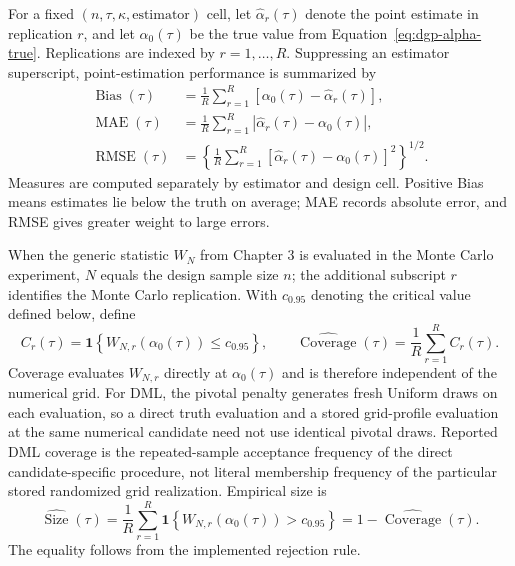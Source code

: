 For a fixed $(n,\tau,\kappa,\text{estimator})$ cell, let $\widehat{\alpha}_r(\tau)$ denote the point estimate in replication $r$, and let $\alpha_0(\tau)$ be the true value from Equation~\eqref{eq:dgp-alpha-true}. Replications are indexed by $r=1,\ldots,R$. Suppressing an estimator superscript, point-estimation performance is summarized by
\begin{equation}
  \begin{aligned}
    \operatorname{Bias}(\tau)
      &=\frac{1}{R}\sum_{r=1}^{R}\left[\alpha_0(\tau)-\widehat{\alpha}_r(\tau)\right], \\
    \operatorname{MAE}(\tau)
      &=\frac{1}{R}\sum_{r=1}^{R}\left|\widehat{\alpha}_r(\tau)-\alpha_0(\tau)\right|, \\
    \operatorname{RMSE}(\tau)
      &=\left\{\frac{1}{R}\sum_{r=1}^{R}\left[\widehat{\alpha}_r(\tau)-\alpha_0(\tau)\right]^2\right\}^{1/2}.
  \end{aligned}
  \label{eq:performance-point}
\end{equation}
Measures are computed separately by estimator and design cell. Positive Bias means estimates lie below the truth on average; MAE records absolute error, and RMSE gives greater weight to large errors.

When the generic statistic $W_N$ from Chapter 3 is evaluated in the Monte Carlo experiment, $N$ equals the design sample size $n$; the additional subscript $r$ identifies the Monte Carlo replication. With $c_{0.95}$ denoting the critical value defined below, define
\begin{equation}
  C_r(\tau)
    =\mathbf{1}\!\left\{W_{N,r}\!\left(\alpha_0(\tau)\right)\leq c_{0.95}\right\},
  \qquad
  \widehat{\operatorname{Coverage}}(\tau)
    =\frac{1}{R}\sum_{r=1}^{R}C_r(\tau).
  \label{eq:performance-coverage}
\end{equation}
Coverage evaluates $W_{N,r}$ directly at $\alpha_0(\tau)$ and is therefore independent of the numerical grid. For DML, the pivotal penalty generates fresh Uniform draws on each evaluation, so a direct truth evaluation and a stored grid-profile evaluation at the same numerical candidate need not use identical pivotal draws. Reported DML coverage is the repeated-sample acceptance frequency of the direct candidate-specific procedure, not literal membership frequency of the particular stored randomized grid realization. Empirical size is
\begin{equation}
  \widehat{\operatorname{Size}}(\tau)
    =\frac{1}{R}\sum_{r=1}^{R}
      \mathbf{1}\!\left\{W_{N,r}\!\left(\alpha_0(\tau)\right)>c_{0.95}\right\}
    =1-\widehat{\operatorname{Coverage}}(\tau).
  \label{eq:performance-size}
\end{equation}
The equality follows from the implemented rejection rule.

